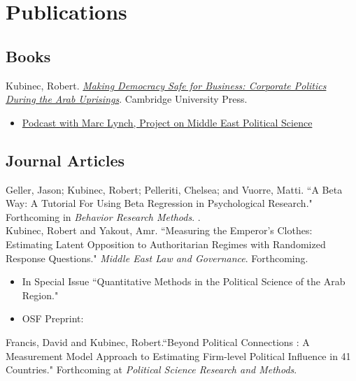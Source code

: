 \documentclass[11pt, a4paper]{article}
\newcommand{\years}[1]{\ifvmode\needspace{3\baselineskip}\fi\marginnote{\scriptsize #1}}
\begin{document}
\section*{Publications}

\subsection*{Books}

\years{2023} Kubinec, Robert. \emph{\href{https://www.cambridge.org/gb/academic/subjects/politics-international-relations/political-economy/making-democracy-safe-business-corporate-politics-during-arab-uprisings?format=HB}{Making Democracy Safe for Business: Corporate Politics During the Arab Uprisings}}. Cambridge University Press.\\

\begin{itemize}
	\item \href{https://pomeps.org/making-democracy-safe-for-business-apsa-virtual-posters-s-13-ep-1}{Podcast with Marc Lynch, Project on Middle East Political Science}
\end{itemize}
 
\subsection*{Journal Articles}

\years{2026} Geller, Jason; Kubinec, Robert; Pelleriti, Chelsea; and Vuorre, Matti. ``A Beta Way: A Tutorial For Using Beta Regression in Psychological Research." Forthcoming in \emph{Behavior Research Methods}. .\\

\years{2026} Kubinec, Robert and Yakout, Amr. ``Measuring the Emperor's Clothes: Estimating Latent Opposition to Authoritarian Regimes with Randomized Response Questions." \emph{Middle East Law and Governance}. Forthcoming. 

\begin{itemize}
	\item In Special Issue ``Quantitative Methods in the Political Science of the Arab Region."
	\item OSF Preprint: 
\end{itemize}

\years{2025}  Francis, David and Kubinec, Robert.``Beyond Political Connections : A Measurement Model Approach to Estimating Firm-level Political Influence in 41 Countries." Forthcoming at \emph{Political Science Research and Methods}. \\
\end{document}
